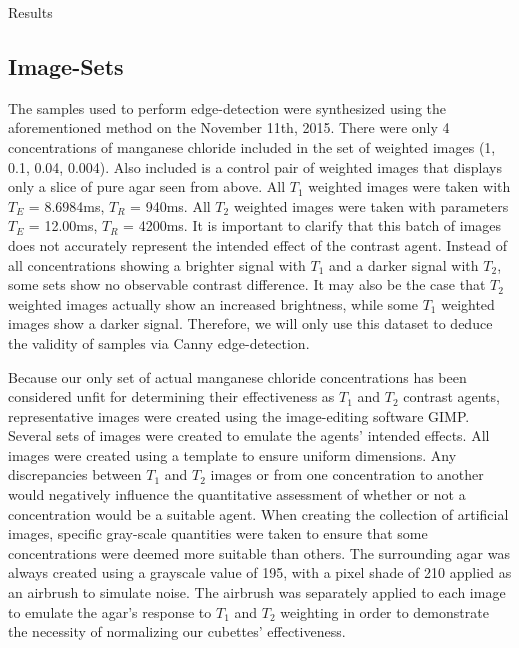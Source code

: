 \documentclass[a4paper,12pt]{article}
\begin{document}
\newpage
\begin{section}{Results}
\subsection{Image-Sets}

The samples used to perform edge-detection were synthesized using the aforementioned method on the November 11th, 2015. There were only 4 concentrations of manganese chloride included in the set of weighted images (1, 0.1, 0.04, 0.004). Also included is a control pair of weighted images that displays only a slice of pure agar seen from above. All $T_1$ weighted images were taken with $T_E$ = 8.6984ms, $T_R$ = 940ms. All $T_2$ weighted images were taken with parameters $T_E$ = 12.00ms, $T_R$ = 4200ms. It is important to clarify that this batch of images does not accurately represent the intended effect of the contrast agent. Instead of all concentrations showing a brighter signal with $T_1$ and a darker signal with $T_2$, some sets show no observable contrast difference. It may also be the case that $T_2$ weighted images actually show an increased brightness, while some $T_1$ weighted images show a darker signal. Therefore, we will only use this dataset to deduce the validity of samples via Canny edge-detection. 

Because our only set of actual manganese chloride concentrations has been considered unfit for determining their effectiveness as $T_1$ and $T_2$ contrast agents, representative images were created using the image-editing software GIMP. Several sets of images were created to emulate the agents' intended effects. All images were created using a template to ensure uniform dimensions. Any discrepancies between $T_1$ and $T_2$ images or from one concentration to another would negatively influence the quantitative assessment of whether or not a concentration would be a suitable agent. When creating the collection of artificial images, specific gray-scale quantities were taken to ensure that some concentrations were deemed more suitable than others. The surrounding agar was always created using a grayscale value of 195, with a pixel shade of 210 applied as an airbrush to simulate noise. The airbrush was separately applied to each image to emulate the agar's response to $T_1$ and $T_2$ weighting in order to demonstrate the necessity of normalizing our cubettes' effectiveness. 


\end{section}
\end{document}
